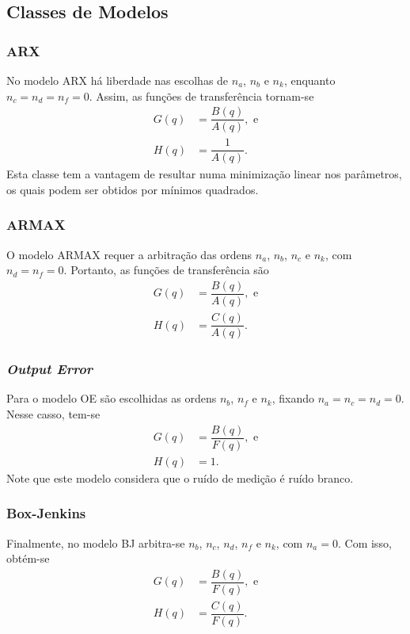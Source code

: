 \documentclass{ppgeesa}
\begin{document}
\subsection{Classes de Modelos}

\subsubsection{ARX}
No modelo ARX há liberdade nas escolhas de $n_a$, $n_b$ e $n_k$, enquanto $n_c = n_d = n_f = 0$.
Assim, as funções de transferência tornam-se
\begin{align}
  G(q) &= \dfrac{B(q)}{A(q)}
  , \text{ e}
  \\
  H(q) &= \dfrac{1}{A(q)}
  .
\end{align}
Esta classe tem a vantagem de resultar numa minimização linear nos parâmetros, os quais podem ser obtidos por mínimos quadrados.

\subsubsection{ARMAX}
O modelo ARMAX requer a arbitração das ordens $n_a$, $n_b$, $n_c$ e $n_k$, com $n_d = n_f = 0$.
Portanto, as funções de transferência são
\begin{align}
  G(q) &= \dfrac{B(q)}{A(q)}
  , \text{ e}
  \\
  H(q) &= \dfrac{C(q)}{A(q)}
  .
\end{align}

\subsubsection{\emph{Output Error}}
Para o modelo OE são escolhidas as ordens $n_b$, $n_f$ e $n_k$, fixando $n_a = n_c = n_d = 0$.
Nesse casso, tem-se
\begin{align}
  G(q) &= \dfrac{B(q)}{F(q)}
  , \text{ e}
  \\
  H(q) &= 1
  .
\end{align}
Note que este modelo considera que o ruído de medição é ruído branco. %

\subsubsection{Box-Jenkins}
Finalmente, no modelo BJ arbitra-se $n_b$, $n_c$, $n_d$, $n_f$ e $n_k$, com $n_a = 0$.
Com isso, obtém-se
\begin{align}
  G(q) &= \dfrac{B(q)}{F(q)}
  , \text{ e}
  \\
  H(q) &= \dfrac{C(q)}{F(q)}
  .
\end{align}
\end{document}
